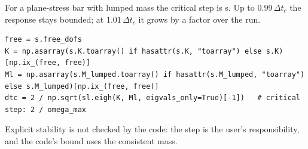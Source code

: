 \newpage\thispagestyle{hl}
\par
{}
\begin{hlheadline}For a plane-stress bar with lumped mass the critical step is \cdyDtcLumped{} s. Up to $0.99\,\Delta t_c$ the response stays bounded; at $1.01\,\Delta t_c$ it grows by a factor \cdyGrowJustOver{} over the run.\end{hlheadline}
\begin{lstlisting}[style=hlpy]
free = s.free_dofs
K = np.asarray(s.K.toarray() if hasattr(s.K, "toarray") else s.K)[np.ix_(free, free)]
Ml = np.asarray(s.M_lumped.toarray() if hasattr(s.M_lumped, "toarray") else s.M_lumped)[np.ix_(free, free)]
dtc = 2 / np.sqrt(sl.eigh(K, Ml, eigvals_only=True)[-1])   # critical step: 2 / omega_max
\end{lstlisting}
\begin{hllimit}Explicit stability is not checked by the code: the step is the user's responsibility, and the code's bound uses the consistent mass.\end{hllimit}
